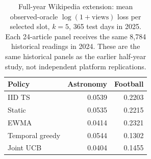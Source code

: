 \begin{table}[!htbp]\centering\small
\begin{lrbox}{\latestTableBox}
\begin{tabular}{lrr}
\toprule
Policy & Astronomy & Football \\
\midrule
IID TS & 0.0539 & 0.2203 \\
Static & 0.0535 & 0.2215 \\
EWMA & 0.0414 & 0.2321 \\
Temporal greedy & 0.0544 & 0.1302 \\
Joint UCB & 0.0404 & 0.1455 \\
\bottomrule
\end{tabular}\end{lrbox}
\ifdim\wd\latestTableBox>\linewidth\resizebox{\linewidth}{!}{\usebox{\latestTableBox}}\else\usebox{\latestTableBox}\fi
\caption{Full-year Wikipedia extension: mean observed-oracle $\log(1+\mathrm{views})$ loss per selected slot, $k=5$, 365 test days in 2025. Each 24-article panel receives the same 8,784 historical readings in 2024. These are the same historical panels as the earlier half-year study, not independent platform replications.}
\label{tab:latest-wikipedia}
\end{table}
